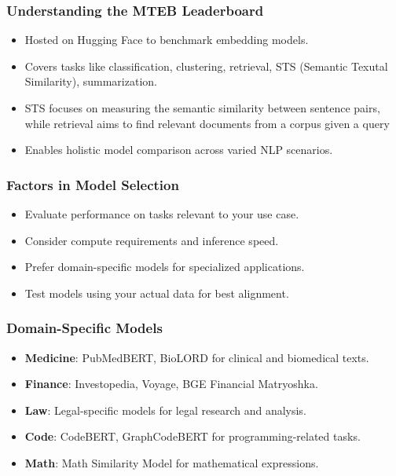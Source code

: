 \begin{frame}[fragile]\frametitle{Understanding the MTEB Leaderboard}
    \begin{itemize}
        \item Hosted on Hugging Face to benchmark embedding models.
        \item Covers tasks like classification, clustering, retrieval, STS (Semantic Texutal Similarity), summarization.
		\item STS focuses on measuring the semantic similarity between sentence pairs, while retrieval aims to find relevant documents from a corpus given a query
        \item Enables holistic model comparison across varied NLP scenarios.
    \end{itemize}
\end{frame}

\begin{frame}[fragile]\frametitle{Factors in Model Selection}
    \begin{itemize}
        \item Evaluate performance on tasks relevant to your use case.
        \item Consider compute requirements and inference speed.
        \item Prefer domain-specific models for specialized applications.
        \item Test models using your actual data for best alignment.
    \end{itemize}
\end{frame}

\begin{frame}[fragile]\frametitle{Domain-Specific Models}
    \begin{itemize}
        \item \textbf{Medicine}: PubMedBERT, BioLORD for clinical and biomedical texts.
        \item \textbf{Finance}: Investopedia, Voyage, BGE Financial Matryoshka.
        \item \textbf{Law}: Legal-specific models for legal research and analysis.
        \item \textbf{Code}: CodeBERT, GraphCodeBERT for programming-related tasks.
        \item \textbf{Math}: Math Similarity Model for mathematical expressions.
    \end{itemize}
\end{frame}


